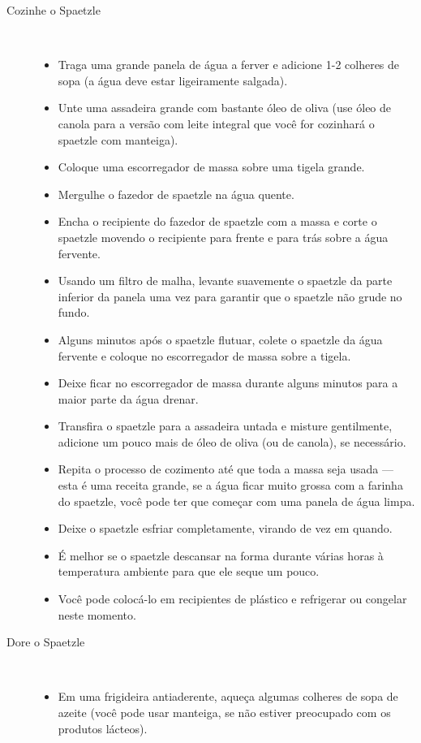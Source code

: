 \documentclass [11pt, letterpaper] {article}
\begin{document}
\begin {description}
\begin {description}
\item [Cozinhe o Spaetzle] \ \\
\begin {itemize}
\item Traga uma grande panela de água a ferver e adicione 1-2 colheres de sopa (a água deve estar ligeiramente salgada).
\item Unte uma assadeira grande com bastante \'oleo de oliva (use óleo de canola para a versão com leite integral que você for cozinhará o spaetzle com manteiga).
\item Coloque uma escorregador de massa sobre uma tigela grande.
\item Mergulhe o fazedor de spaetzle na água quente.
\item Encha o recipiente do fazedor de spaetzle com a massa e corte o spaetzle movendo o recipiente para frente e para trás sobre a água fervente.
\item Usando um filtro de malha, levante suavemente o spaetzle da parte inferior da panela uma vez para garantir que o spaetzle não grude no fundo.
\item Alguns minutos após o spaetzle flutuar, colete o spaetzle da água fervente e coloque no escorregador de massa sobre a tigela.
\item Deixe ficar no escorregador de massa durante alguns minutos para a maior parte da água drenar.
\item Transfira o spaetzle para a assadeira untada e misture gentilmente, adicione um pouco mais de \'oleo de oliva (ou de canola), se necessário.
\item Repita o processo de cozimento até que toda a massa seja usada --- esta é uma receita grande, se a água ficar muito grossa com a farinha do spaetzle, você pode ter que começar com uma panela de água limpa.
\item Deixe o spaetzle esfriar completamente, virando de vez em quando.
\item É melhor se o spaetzle descansar na forma durante várias horas à temperatura ambiente para que ele seque um pouco.
\item Você pode colocá-lo em recipientes de plástico e refrigerar ou congelar neste momento.
\end {itemize}
\item [Dore o Spaetzle] \ \\
\begin {itemize}
\item Em uma frigideira antiaderente, aqueça algumas colheres de sopa de azeite (você pode usar manteiga, se não estiver preocupado com os produtos lácteos).

\end{itemize}
\end{description}
\end{description}
\end{document}
